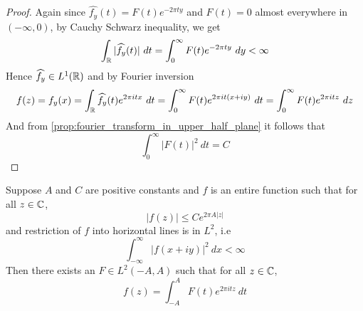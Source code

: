 \begin{proof}
  Again since $\widehat{f_y}(t) = F(t)e^{-2\pi ty}$ and $F(t) = 0$ almost everywhere in $(-\infty, 0)$, by Cauchy Schwarz inequality, we get
  $$\int_\mathbb R |\widehat{f_y}(t)| \ dt = \int_{0}^\infty F(t) e^{-2\pi ty} \ dy < \infty$$
  Hence $\widehat{f_y} \in L^1(\mathbb R)$ and by Fourier inversion
  $$f(z) = f_y(x) = \int_\mathbb R \widehat{f_y}(t) e^{2\pi it x}\ dt = \int_0^\infty F(t)e^{2\pi it(x+iy)} \ dt = \int_{0}^\infty F(t)e^{2\pi itz} \ dz$$
  And from \autoref{prop:fourier_transform_in_upper_half_plane} it follows that $$\int_0^\infty |F(t)|^2 \ dt = C$$
\end{proof}

\begin{theorem}
  \label{thm:paley_wiener_2}
  Suppose $A$ and $C$ are positive constants and $f$ is an entire function such that for all $z \in \mathbb C$, $$|f(z)| \le Ce^{2\pi A |z|}$$
  and restriction of $f$ into horizontal lines is in $L^2$, i.e $$\int_{-\infty}^\infty |f(x +iy)|^2 \ dx < \infty$$
  Then there exists an $F \in L^2(-A, A)$ such that for all $z\in \mathbb C$, $$f(z) = \int_{-A}^A F(t)e^{2 \pi it z} \ dt $$
\end{theorem}
